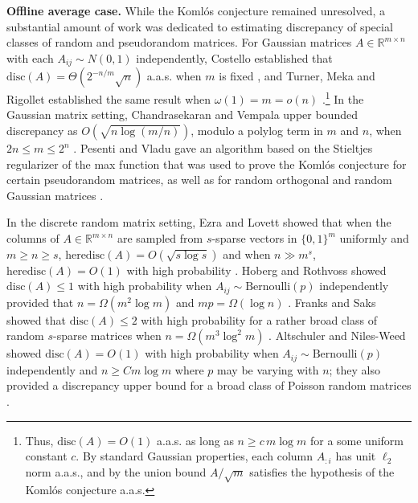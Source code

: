 \documentclass[reqno]{amsart}
\numberwithin{equation}{section}
\newcommand{\R}{\mathbb R}
\begin{document}
\textbf{Offline average case.} While the  Koml\'os conjecture remained unresolved, a substantial amount of work was dedicated to estimating discrepancy of special classes of random and pseudorandom matrices. For  Gaussian matrices $A \in \R^{m \times n}$ with each $A_{ij} \sim N(0,1)$ independently, Costello established that $\text{disc}(A) = \Theta (2^{-n/m}\sqrt{n})$ a.a.s. when $m$ is fixed \cite{Costello09},  and Turner, Meka and Rigollet established the same result when $\omega(1) = m =o(n)$ \cite{TMR20}.\footnote{Thus, $\text{disc}(A) = O(1)$ a.a.s. as long as $n \geq c\, m \log m$ for a some uniform constant $c$. By standard Gaussian properties, each column $A_{:i}$ has unit $\ell_2$ norm  a.a.s., and by the union bound $A/\sqrt {m}$  satisfies the hypothesis of the    Koml\'os conjecture a.a.s.} In the Gaussian matrix setting, Chandrasekaran and Vempala upper bounded  discrepancy as $O(\sqrt {n \log (m/n)})$, modulo a polylog term in $m$ and $n$, when $2n \leq m \leq 2^n$ \cite {CV14}.   Pesenti and Vladu gave an algorithm based on the Stieltjes regularizer  of the max function that  was used to prove the Koml\'os conjecture  for  certain pseudorandom matrices, as well as for random orthogonal and random Gaussian matrices \cite{PesentiVladu2023}.     

In the discrete random matrix setting, Ezra and Lovett showed that when the columns of $A\in \R^{m \times n}$ are sampled from $s$-sparse vectors in $\{0,1\}^m$ uniformly and  $m \geq n \geq s$,  $\text{heredisc}(A) = O(\sqrt {s \log s})$ and when $n \gg m^s$,  $\text{heredisc}(A) = O(1)$ with high probability \cite{EL19}. Hoberg and Rothvoss showed $\text{disc}(A) \leq 1$ with high probability when $A_{ij} \sim \text{Bernoulli}(p)$ independently provided that $n = \Omega (m^2 \log m)$ and $mp = \Omega (\log n)$ \cite{HR19}. Franks and Saks showed that $\text{disc}(A) \leq 2$ with high probability for a rather broad class of random $s$-sparse matrices when   $n = \Omega (m^3 \log^2 m)$ \cite{FS20}.  Altschuler and Niles-Weed showed $\text{disc}(A) = O(1)$ with high probability when $A_{ij} \sim \text{Bernoulli}(p)$ independently and $n \geq C m \log m$ where $p$ may be varying with $n$; they also provided a  discrepancy upper bound for a broad class of Poisson random matrices \cite{AN22}. 
 
      
\end{document}
